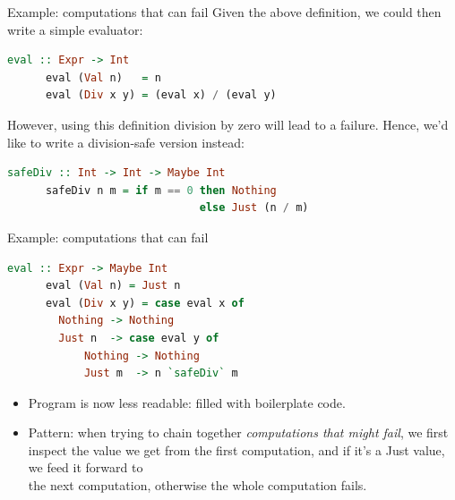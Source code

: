\documentclass{beamer}
\begin{document}
\begin{frame}[fragile]{Example: computations that can fail}
    Given the above definition, we could then write a simple evaluator:

    \begin{minipage}{\linewidth} \hspace{1cm}
    \begin{lstlisting}[language=haskell, numbers=none, frame=none]
      eval :: Expr -> Int
      eval (Val n)   = n
      eval (Div x y) = (eval x) / (eval y)
    \end{lstlisting}
    \end{minipage} \hspace{1cm}

    However, using this definition division by zero will lead to a
    failure. Hence, we'd like to write a division-safe version instead:

    \begin{minipage}{\linewidth} \hspace{1cm}
    \begin{lstlisting}[language=haskell, numbers=none, frame=none]
      safeDiv :: Int -> Int -> Maybe Int
      safeDiv n m = if m == 0 then Nothing
                              else Just (n / m)
    \end{lstlisting}
    \end{minipage} \hspace{1cm}
\end{frame}

\begin{frame}[fragile]{Example: computations that can fail}
    \begin{minipage}{\linewidth} \hspace{1cm}
    \begin{lstlisting}[language=haskell, numbers=none, frame=none]
      eval :: Expr -> Maybe Int
      eval (Val n) = Just n
      eval (Div x y) = case eval x of
        Nothing -> Nothing
        Just n  -> case eval y of
            Nothing -> Nothing
            Just m  -> n `safeDiv` m
    \end{lstlisting}
    \end{minipage} \hspace{1cm}

    \begin{itemize}
        \item Program is now less readable: filled with boilerplate code.
        \item Pattern: when trying to chain together \textit{computations
        that might fail}, we first inspect the value we get from the first
        computation, and if it's a Just value, we feed it forward to\\
        the next computation, otherwise the whole computation fails.
    \end{itemize}
\end{frame}
\end{document}
